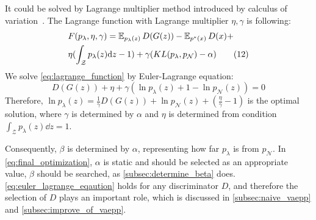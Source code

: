 It could be solved by Lagrange multiplier method introduced by calculus of variation~\cite{gelfand2000calculus}. The Lagrange function with Lagrange multiplier $\eta, \gamma$ is following:
\begin{align*}\label{eq:lagrange_function}
& F(p_\lambda, \eta, \gamma) = \operatorname{\mathbb{E}}_{p_\lambda(z)} D(G(z))  - \operatorname{\mathbb{E}}_{p^*(x)} D(x) + \\
& \eta (\int_{\mathcal{Z}} p_\lambda(z) \mathrm{d} z - 1) + \gamma(KL(p_\lambda, p_\mathcal{N}) - \alpha) \tag{12}
\end{align*}
We solve \cref{eq:lagrange_function} by Euler-Lagrange equation:
\begin{equation*}\label{eq:euler_lagrange_eqaution}
	D(G(z)) + \eta + \gamma (\ln p_\lambda(z) + 1 - \ln p_\mathcal{N}(z)) = 0 \tag{13}
\end{equation*}
Therefore, $\ln p_\lambda(z) = \frac{1}{\gamma} D(G(z)) + \ln p_\mathcal{N}(z) + (\frac{\eta}{\gamma} - 1)$ is the optimal solution, where $\gamma$ is determined by $\alpha$ and $\eta$ is determined from condition $\int_{\mathcal{Z}} p_\lambda(z) \dd z = 1$.

 Consequently, $\beta$ is determined by $\alpha$, representing how far $p_\lambda$ is from $p_\mathcal{N}$. In \cref{eq:final_optimization}, $\alpha$ is static and should be selected as an appropriate value, \IE $\beta$ should be searched, as \cref{subsec:determine_beta} does. \cref{eq:euler_lagrange_eqaution} holds for any discriminator $D$, and therefore the selection of $D$ plays an important role, which is discussed in \cref{subsec:naive_vaepp} and \cref{subsec:improve_of_vaepp}.
 
 